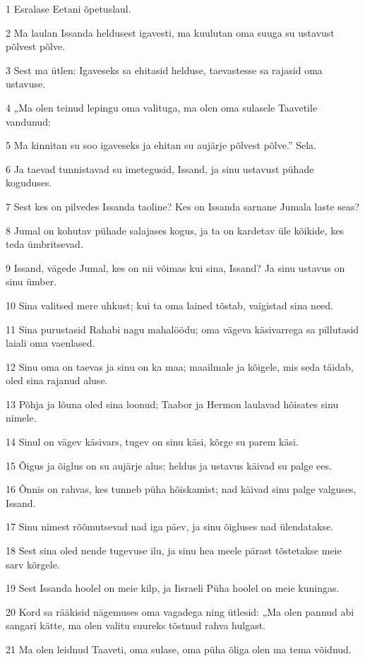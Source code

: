 \par 1 Esralase Eetani õpetuslaul.
\par 2 Ma laulan Issanda heldusest igavesti, ma kuulutan oma suuga su ustavust põlvest põlve.
\par 3 Sest ma ütlen: Igaveseks sa ehitasid helduse, taevastesse sa rajasid oma ustavuse.
\par 4 „Ma olen teinud lepingu oma valituga, ma olen oma sulasele Taavetile vandunud:
\par 5 Ma kinnitan su soo igaveseks ja ehitan su aujärje põlvest põlve.” Sela.
\par 6 Ja taevad tunnistavad su imetegusid, Issand, ja sinu ustavust pühade koguduses.
\par 7 Sest kes on pilvedes Issanda taoline? Kes on Issanda sarnane Jumala laste seas?
\par 8 Jumal on kohutav pühade salajases kogus, ja ta on kardetav üle kõikide, kes teda ümbritsevad.
\par 9 Issand, vägede Jumal, kes on nii võimas kui sina, Issand? Ja sinu ustavus on sinu ümber.
\par 10 Sina valitsed mere uhkust; kui ta oma lained tõstab, vaigistad sina need.
\par 11 Sina purustasid Rahabi nagu mahalöödu; oma vägeva käsivarrega sa pillutasid laiali oma vaenlased.
\par 12 Sinu oma on taevas ja sinu on ka maa; maailmale ja kõigele, mis seda täidab, oled sina rajanud aluse.
\par 13 Põhja ja lõuna oled sina loonud; Taabor ja Hermon laulavad hõisates sinu nimele.
\par 14 Sinul on vägev käsivars, tugev on sinu käsi, kõrge su parem käsi.
\par 15 Õigus ja õiglus on su aujärje alus; heldus ja ustavus käivad su palge ees.
\par 16 Õnnis on rahvas, kes tunneb püha hõiskamist; nad käivad sinu palge valguses, Issand.
\par 17 Sinu nimest rõõmutsevad nad iga päev, ja sinu õigluses nad ülendatakse.
\par 18 Sest sina oled nende tugevuse ilu, ja sinu hea meele pärast tõstetakse meie sarv kõrgele.
\par 19 Sest Issanda hoolel on meie kilp, ja Iisraeli Püha hoolel on meie kuningas.
\par 20 Kord sa rääkisid nägemuses oma vagadega ning ütlesid: „Ma olen pannud abi sangari kätte, ma olen valitu suureks tõstnud rahva hulgast.
\par 21 Ma olen leidnud Taaveti, oma sulase, oma püha õliga olen ma tema võidnud.
